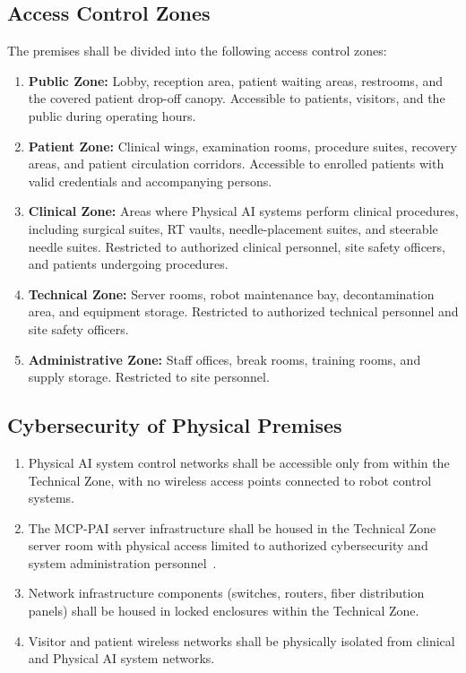 \documentclass[11pt,letterpaper]{article}
\begin{document}
\subsection{Access Control Zones}

The premises shall be divided into the following access control zones:

\begin{enumerate}[label=(\alph*)]
\item \textbf{Public Zone:} Lobby, reception area, patient waiting areas,
  restrooms, and the covered patient drop-off canopy. Accessible to patients,
  visitors, and the public during operating hours.

\item \textbf{Patient Zone:} Clinical wings, examination rooms, procedure
  suites, recovery areas, and patient circulation corridors. Accessible to
  enrolled patients with valid credentials and accompanying persons.

\item \textbf{Clinical Zone:} Areas where Physical AI systems perform clinical
  procedures, including surgical suites, RT vaults, needle-placement suites,
  and steerable needle suites. Restricted to authorized clinical personnel,
  site safety officers, and patients undergoing procedures.

\item \textbf{Technical Zone:} Server rooms, robot maintenance bay,
  decontamination area, and equipment storage. Restricted to authorized
  technical personnel and site safety officers.

\item \textbf{Administrative Zone:} Staff offices, break rooms, training rooms,
  and supply storage. Restricted to site personnel.
\end{enumerate}

\subsection{Cybersecurity of Physical Premises}

\begin{enumerate}[label=(\alph*)]
\item Physical AI system control networks shall be accessible only from within
  the Technical Zone, with no wireless access points connected to robot control
  systems.

\item The MCP-PAI server infrastructure shall be housed in the Technical Zone
  server room with physical access limited to authorized cybersecurity and
  system administration personnel~\cite{iche6r3adapt}.

\item Network infrastructure components (switches, routers, fiber distribution
  panels) shall be housed in locked enclosures within the Technical Zone.

\item Visitor and patient wireless networks shall be physically isolated from
  clinical and Physical AI system networks.
\end{enumerate}
\end{document}
